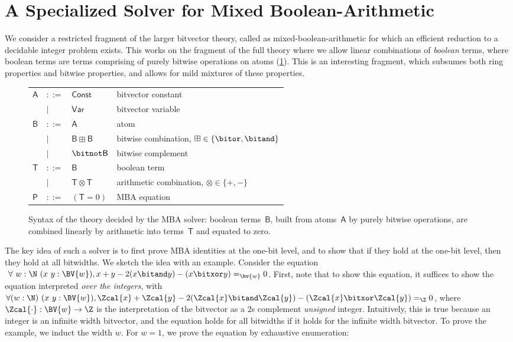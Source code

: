 \section{A Specialized Solver for Mixed Boolean-Arithmetic}
\label{sec:swbv:mba}

We consider a restricted fragment of the larger bitvector theory, called as mixed-boolean-arithmetic \cite{liu2021mba}
for which an efficient reduction to a decidable integer problem exists.
This works on the fragment of the full theory where we allow linear combinations of \emph{boolean} terms,
where boolean terms are terms comprising of purely bitwise operations on atoms (\cref{fig:swbv:mba-syntax}).
This is an interesting fragment, which subsumes both ring properties and bitwise properties,
and allows for mild mixtures of these properties.

\begin{figure}[htb]
\centering
{\footnotesize
\begin{tabular}{llll}
$\mathsf{A}$ & $::=$ & $\mathsf{Const}$ & bitvector constant \\
    & $\mid$ & $\mathsf{Var}$ & bitvector variable \\[4pt]
$\mathsf{B}$ & $::=$ & $\mathsf{A}$ & atom \\
    & $\mid$ & $\mathsf{B} \boxplus \mathsf{B}$ & bitwise combination, $\boxplus \in \{\bitor, \bitand\}$ \\
    & $\mid$ & $\bitnot \mathsf{B}$ & bitwise complement \\[4pt]
$\mathsf{T}$ & $::=$ & $\mathsf{B}$ & boolean term \\
    & $\mid$ & $\mathsf{T} \otimes \mathsf{T}$ & arithmetic combination, $\otimes \in \{+, -\}$ \\[4pt]
$\mathsf{P}$ & $::=$ & $(\mathsf{T} = 0)$ & MBA equation \\
\end{tabular}
}
\caption{Syntax of the theory decided by the MBA solver: boolean
terms~$\mathsf{B}$, built from atoms~$\mathsf{A}$ by purely bitwise
operations, are combined linearly by arithmetic into terms~$\mathsf{T}$ and
equated to zero.}
\label{fig:swbv:mba-syntax}
\end{figure}

The key idea of such a solver is to first prove MBA identities at the one-bit level,
and to show that if they hold at the one-bit level, then they hold at all bitwidths.
We sketch the idea with an example.
Consider the equation $~\forall~{w : \N}~(x~y : \BV{w}),x + y - 2 (x \bitand y) - (x \bitxor y) =_{\bv{w}} 0$.
First, note that to show this equation, it suffices to show the equation interpreted \emph{over the integers},
with $\forall (w : \N)~(x~y : \BV{w}), \Zcal{x} + \Zcal{y} - 2 (\Zcal{x} \bitand \Zcal{y}) - (\Zcal{x} \bitxor \Zcal{y}) =_{\Z} 0$,
where $\Zcal{\cdot} : \BV{w} \to \Z$ is the interpretation of the bitvector as a 2s complement \emph{unsigned} integer.
Intuitively, this is true because an integer is an infinite width bitvector,
and the equation holds for all bitwidths if it holds for the infinite width bitvector.
To prove the example, we induct the width $w$.
For $w = 1$, we prove the equation by exhaustive enumeration:

